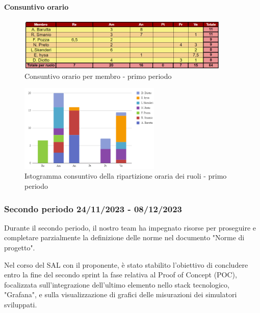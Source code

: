 \paragraph*{Consuntivo orario} \hspace{1pt}

\begin{figure}[H]
    \centering
    \includegraphics[width=0.9\textwidth]{../Images/consuntivoOrario1Periodo.png}
    \caption{Consuntivo orario per membro - primo periodo}
    \label{fig:Constuntivo_orario_1}
\end{figure}

\begin{figure}[H]
    \centering
    \includegraphics[width=0.6\textwidth]{../Images/consuntivoDivisioneRuoli1Periodo.png}
    \caption{Istogramma consuntivo della ripartizione oraria dei ruoli - primo periodo}
    \label{fig:Consuntivo_ripartizione_oraria_1}
\end{figure}


\subsubsection{Secondo periodo  24/11/2023 - 08/12/2023}
Durante il secondo periodo, il nostro team ha impegnato risorse per proseguire e completare parzialmente la definizione delle norme nel documento "Norme di progetto".

Nel corso del SAL con il proponente, è stato stabilito l'obiettivo di concludere entro la fine del secondo sprint la fase relativa al Proof of Concept (POC), focalizzata sull'integrazione dell'ultimo elemento nello stack tecnologico, "Grafana", e sulla visualizzazione di grafici delle misurazioni dei simulatori sviluppati.

